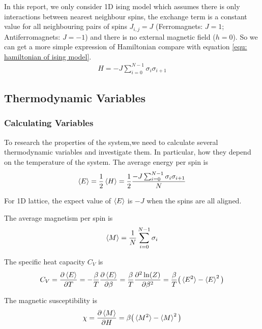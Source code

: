 \documentclass[12pt]{article}
\begin{document}
	In this report, we only consider 1D ising model which assumes there is only interactions between nearest neighbour spins, the exchange term is a constant value for all neighbouring pairs of spins $J_{i,j}=J$ (Ferromagnets: $J=1$; Antiferromagnets: $J=-1$) and there is no external magnetic field ($h=0$). So we can get a more simple expression of Hamiltonian compare with equation \ref{equ: hamiltonian of ising model}.
	\begin{align}
		H=-J\sum_{i=0}^{N-1} \sigma_i \sigma_{i+1}
	\end{align}
	
	\subsection{Thermodynamic Variables}
	\label{sec； thermodynamic variables}
	\subsubsection{Calculating Variables}
	\label{subsubsec: calculateing variables}
	To research the properties of the system,we need to calculate several thermodynamic variables and investigate them. In particular, how they depend on the temperature of the system. The average energy per spin is
	\begin{align}\label{equ: average energy per spin}
		\braket{E}=\frac{1}{2}\braket{H}=\frac{1}{2}\frac{-J \sum_{i=0}^{N-1} \sigma_i \sigma_{i+1}}{N}
	\end{align}
	
	For 1D lattice, the expect value of $\braket{E}$ is $-J$ when the spins are all aligned.
	
	The average magnetism per spin is 
	\begin{align}\label{equ: average magnetization per spin}
		\braket{M}=\frac{1}{N}\sum_{i=0}^{N-1} \sigma_i
	\end{align}
	
	The specific heat capacity $C_V$ is 
	\begin{align}\label{equ: spefic heat capacity}
		C_V=\frac{\partial \braket{E}}{\partial T}=-\frac{\beta}{T} \frac{\partial \braket{E}}{\partial \beta}=\frac{\beta}{T}\frac{\partial ^2 \ln(Z)}{\partial \beta ^2}=\frac{\beta}{T}\big(\braket{E^2}-\braket{E}^2\big)
	\end{align}
	
	The magnetic susceptibility is 
	\begin{align}\label{equ: susceptibility}
		\chi=\frac{\partial \braket{M}}{\partial H}=\beta \big(\braket{M^2}-\braket{M}^2 \big)
	\end{align}
	
\end{document}
